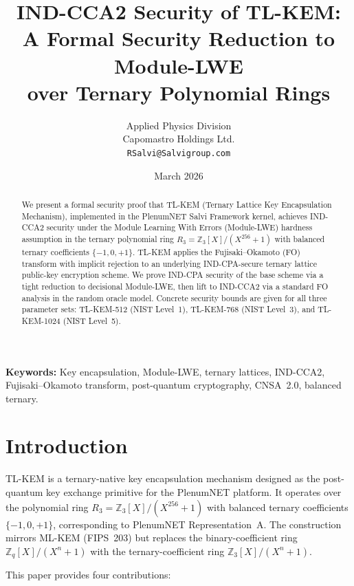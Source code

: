 \documentclass[11pt,a4paper]{article}
\title{%
  \textbf{IND-CCA2 Security of TL-KEM:\\
  A Formal Security Reduction to Module-LWE\\
  over Ternary Polynomial Rings}%
}
\author{%
  Applied Physics Division\\
  Capomastro Holdings Ltd.\\
  \texttt{RSalvi@Salvigroup.com}%
}
\date{March 2026}
\theoremstyle{definition}
\newcommand{\Z}{\mathbb{Z}}
\newcommand{\Rq}{R_3}
\begin{document}
\maketitle

\begin{abstract}
We present a formal security proof that TL-KEM (Ternary Lattice Key Encapsulation Mechanism), implemented in the PlenumNET Salvi Framework kernel, achieves IND-CCA2 security under the Module Learning With Errors (Module-LWE) hardness assumption in the ternary polynomial ring $\Rq = \Z_3[X]/(X^{256}+1)$ with balanced ternary coefficients $\{-1, 0, +1\}$. TL-KEM applies the Fujisaki--Okamoto (FO) transform with implicit rejection to an underlying IND-CPA-secure ternary lattice public-key encryption scheme. We prove IND-CPA security of the base scheme via a tight reduction to decisional Module-LWE, then lift to IND-CCA2 via a standard FO analysis in the random oracle model. Concrete security bounds are given for all three parameter sets: TL-KEM-512 (NIST Level~1), TL-KEM-768 (NIST Level~3), and TL-KEM-1024 (NIST Level~5).
\end{abstract}

\medskip
\noindent\textbf{Keywords:} Key encapsulation, Module-LWE, ternary lattices, IND-CCA2, Fujisaki--Okamoto transform, post-quantum cryptography, CNSA~2.0, balanced ternary.

\tableofcontents

\section{Introduction}
\label{sec:intro}

TL-KEM is a ternary-native key encapsulation mechanism designed as the post-quantum key exchange primitive for the PlenumNET platform. It operates over the polynomial ring $\Rq = \Z_3[X]/(X^{256}+1)$ with balanced ternary coefficients $\{-1,0,+1\}$, corresponding to PlenumNET Representation~A. The construction mirrors ML-KEM (FIPS~203) but replaces the binary-coefficient ring $\Z_q[X]/(X^n+1)$ with the ternary-coefficient ring $\Z_3[X]/(X^n+1)$.

This paper provides four contributions:
\end{document}
